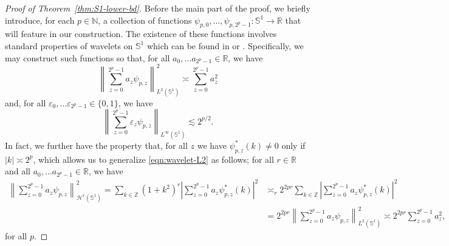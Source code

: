 \documentclass[preprint]{imsart}
\theoremstyle{plain}
\theoremstyle{definition}
\newcommand{\Rbb}{\mathbb{R}}
\newcommand{\Zbb}{\mathbb{Z}}
\newcommand{\Nbb}{\mathbb{N}}
\newcommand{\Hcal}{\mathcal{H}}
\begin{document}
\begin{appendix}
\begin{proof}[Proof of Theorem~\ref{thm:S1-lower-bd}]
    Before the main part of the proof, we briefly introduce, for each $p\in\Nbb$, a collection of functions $\psi_{p,0},\ldots, \psi_{p,2^{p}-1}:\mathbb{S}^1\to\Rbb$ that will feature in our construction.
    The existence of these functions involves standard properties of wavelets on $\mathbb{S}^1$ which can be found in \cite[Theorem~7.2]{WalterShen} or \cite[Section~2]{Balid2009}.
    Specifically, we may construct such functions so that, for all $a_0,\ldots a_{2^p-1}\in\Rbb$, we have
    \begin{equation}\label{eqn:wavelet-L2}
        \left\|\sum_{z=0}^{2^p-1}a_z\psi_{p,z}\right\|_{L^2(\mathbb{S}^1)}^2\asymp\sum_{z=0}^{2^p-1}a_z^2
    \end{equation}
    and, for all $\varepsilon_0,\ldots \varepsilon_{2^p-1}\in\{0,1\}$, we have 
    \begin{equation}\label{eqn:wavelet-Linf}
        \left\|\sum_{z=0}^{2^p-1}\varepsilon_z\psi_{p,z}\right\|_{L^{\infty}(\mathbb{S}^1)}\lesssim 2^{p/2}.
    \end{equation}   
    In fact, we further have the property that, for all $z$ we have $\psi_{p,z}^{\ast}(k)\neq 0$ only if $|k|\asymp 2^p$, which allows us to generalize \eqref{eqn:wavelet-L2} as follows; for all $r\in\Rbb$ and all $a_0,\ldots a_{2^p-1}\in\Rbb$, we have \begin{equation}\label{eqn:wavelet-Hr}
        \begin{split}
        \left\|\sum_{z=0}^{2^p-1}a_z\psi_{p,z}\right\|_{\Hcal^r(\mathbb{S}^1)}^2 = \sum_{k\in\Zbb}(1+k^2)^r\left|\sum_{z=0}^{ 2^p-1}a_z\psi_{p,z}^{\ast}(k)\right|^2 &\asymp_r 2^{2pr}\sum_{k\in\Zbb}\left|\sum_{z=0}^{2^p-1} a_z\psi_{p,z}^{\ast}(k)\right|^2 \\
        &=2^{2pr}\left\|\sum_{z=0}^{2^p-1}a_z\psi_{p,z}\right\|^2_{L^2(\mathbb{S}^1)}\asymp2^{2pr}\sum_{z=0}^{2^p-1}a_z^2,    
        \end{split}
    \end{equation}
    for all $p$.


\end{proof}
\end{appendix}
\end{document}

